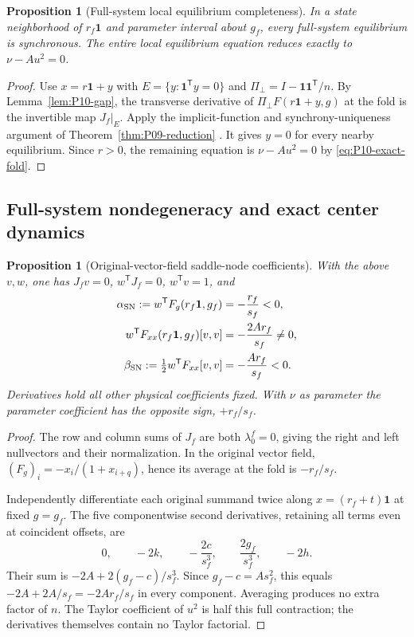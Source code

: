\documentclass[11pt]{article}
\let\OriginalCite\cite
\renewcommand{\cite}[2][]{%
  \textcolor{CitationRed}{%
    \if\relax\detokenize{#1}\relax
      \OriginalCite{#2}%
    \else
      \OriginalCite[#1]{#2}%
    \fi}}
\newcommand{\one}{\mathbf{1}}
\newtheorem{proposition}[theorem]{Proposition}
\theoremstyle{definition}
\theoremstyle{remark}
\begin{document}
\begin{proposition}[Full-system local equilibrium completeness]
\label{prop:P10-reduction}
In a state neighborhood of $r_f\one$ and parameter interval about
$g_f$, every full-system equilibrium is synchronous. The entire local
equilibrium equation reduces exactly to $\nu-Au^2=0$.
\end{proposition}
\begin{proof}
Use $x=r\one+y$ with $E=\{y:\one^{\mathsf T}y=0\}$ and
$\Pi_\perp=I-\one\one^{\mathsf T}/n$. By Lemma~\ref{lem:P10-gap},
the transverse derivative of $\Pi_\perp F(r\one+y,g)$ at the fold
is the invertible map $J_f|_E$. Apply the implicit-function and
synchrony-uniqueness argument of Theorem~\ref{thm:P09-reduction}
\cite[Ch.~1]{GuckenheimerHolmes1983}. It gives $y=0$ for every
nearby equilibrium. Since $r>0$, the remaining equation is
$\nu-Au^2=0$ by \eqref{eq:P10-exact-fold}.
\end{proof}

\subsection{Full-system nondegeneracy and exact center dynamics}

\begin{proposition}[Original-vector-field saddle-node coefficients]
\label{prop:P10-coefficients}
With the above $v,w$, one has $J_fv=0$, $w^{\mathsf T}J_f=0$,
$w^{\mathsf T}v=1$, and
\begin{align}
 \alpha_{\rm SN}:=w^{\mathsf T}F_g(r_f\one,g_f)
 &=-\frac{r_f}{s_f}<0,\label{eq:P10-alpha}\\
 w^{\mathsf T}F_{xx}(r_f\one,g_f)[v,v]
 &=-\frac{2Ar_f}{s_f}\ne0,\label{eq:P10-contraction}\\
 \beta_{\rm SN}:=\tfrac12w^{\mathsf T}F_{xx}[v,v]
 &=-\frac{Ar_f}{s_f}<0.\label{eq:P10-beta}
\end{align}
Derivatives hold all other physical coefficients fixed. With $\nu$
as parameter the parameter coefficient has the opposite sign,
$+r_f/s_f$.
\end{proposition}
\begin{proof}
The row and column sums of $J_f$ are both $\lambda_0^f=0$, giving
the right and left nullvectors and their normalization. In the original
vector field, $(F_g)_i=-x_i/(1+x_{i+q})$, hence its average at the
fold is $-r_f/s_f$.

Independently differentiate each original summand twice along
$x=(r_f+t)\one$ at fixed $g=g_f$. The five componentwise second
derivatives, retaining all terms even at coincident offsets, are
\[
 0,\qquad -2k,\qquad -\frac{2c}{s_f^3},\qquad
 \frac{2g_f}{s_f^3},\qquad -2h.
\]
Their sum is $-2A+2(g_f-c)/s_f^3$. Since $g_f-c=A s_f^2$,
this equals $-2A+2A/s_f=-2Ar_f/s_f$ in every component.
Averaging produces no extra factor of $n$. The Taylor coefficient
of $u^2$ is half this full contraction; the derivatives themselves
contain no Taylor factorial.
\end{proof}
\end{document}
